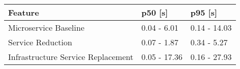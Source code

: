 \begin{tabular}{lll}
\toprule
Feature & p50 [s] & p95 [s] \\
\midrule
Microservice Baseline & 0.04 - 6.01 & 0.14 - 14.03 \\
Service Reduction & 0.07 - 1.87 & 0.34 - 5.27 \\
Infrastructure Service Replacement & 0.05 - 17.36 & 0.16 - 27.93 \\
\bottomrule
\end{tabular}
